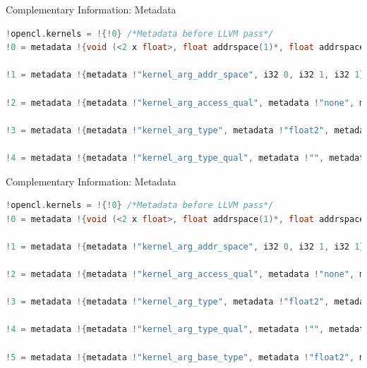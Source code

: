 \documentclass{beamer}
\begin{document}
\begin{frame}[fragile]{Complementary Information: Metadata}
  \begin{lstlisting}[language=C]
!opencl.kernels = !{!0} /*Metadata before LLVM pass*/
!0 = metadata !{void (<2 x float>, float addrspace(1)*, float addrspace(1)*)* @addition, metadata !1, metadata !2, metadata !3, metadata !4, metadata !5}

!1 = metadata !{metadata !"kernel_arg_addr_space", i32 0, i32 1, i32 1}

!2 = metadata !{metadata !"kernel_arg_access_qual", metadata !"none", metadata !"none", metadata !"none"}

!3 = metadata !{metadata !"kernel_arg_type", metadata !"float2", metadata !"float*", metadata !"float*"}

!4 = metadata !{metadata !"kernel_arg_type_qual", metadata !"", metadata !"const", metadata !""}
  \end{lstlisting}
\end{frame}
\begin{frame}[fragile]{Complementary Information: Metadata}
  \begin{lstlisting}[language=C]
!opencl.kernels = !{!0} /*Metadata before LLVM pass*/
!0 = metadata !{void (<2 x float>, float addrspace(1)*, float addrspace(1)*)* @addition, metadata !1, metadata !2, metadata !3, metadata !4, metadata !5}

!1 = metadata !{metadata !"kernel_arg_addr_space", i32 0, i32 1, i32 1}

!2 = metadata !{metadata !"kernel_arg_access_qual", metadata !"none", metadata !"none", metadata !"none"}

!3 = metadata !{metadata !"kernel_arg_type", metadata !"float2", metadata !"float*", metadata !"float*"}

!4 = metadata !{metadata !"kernel_arg_type_qual", metadata !"", metadata !"const", metadata !""}

!5 = metadata !{metadata !"kernel_arg_base_type", metadata !"float2", metadata !"float*", metadata !"float*"}
  \end{lstlisting}
\end{frame}
\end{document}
